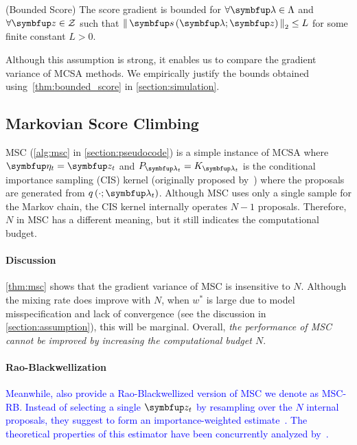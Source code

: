 \begin{assumption}{(Bounded Score)}\label{thm:bounded_score}
  The score gradient is bounded for \(\forall \vlambda \in \Lambda\) and \(\forall \vz \in \mathcal{Z}\) such that \(\norm{\vs\left(\vlambda; \vz\right)}_2 \leq L \) for some finite constant \(L > 0\).
\end{assumption}
%
Although this assumption is strong, it enables us to compare the gradient variance of MCSA methods.
We empirically justify the bounds obtained using~\cref{thm:bounded_score} in \cref{section:simulation}.

\vspace{-0.07in}
\subsection{Markovian Score Climbing}
\vspace{-0.07in}

MSC (\cref{alg:msc} in \cref{section:pseudocode}) is a simple instance of MCSA where \(\veta_t = \vz_t\) and \(P_{\vlambda_t} = K_{\vlambda_t}\) is the conditional importance sampling (CIS) kernel (originally proposed by~\citet{andrieu_uniform_2018}) where the proposals are generated from \(q\left(\cdot; \vlambda_t\right)\).
Although MSC uses only a single sample for the Markov chain, the CIS kernel internally operates \(N-1\) proposals.
Therefore, \(N\) in MSC has a different meaning, but it still indicates the computational budget.


\vspace{0.04in}


\vspace{-0.1in}
\paragraph{Discussion}
\cref{thm:msc} shows that the gradient variance of MSC is insensitive to \(N\).
Although the mixing rate does improve with \(N\), when \(w^*\) is large due to model misspecification and lack of convergence (see the discussion in \cref{section:assumption}), this will be marginal.
Overall, \textit{the performance of MSC cannot be improved by increasing the computational budget \(N\)}.

\vspace{-0.1in}
\paragraph{Rao-Blackwellization}
\textcolor{blue}{
Meanwhile, \citeauthor{NEURIPS2020_b2070693} also provide a Rao-Blackwellized version of MSC we denote as MSC-RB.
Instead of selecting a single \(\vz_t\) by resampling over the \(N\) internal proposals, they suggest to form an importance-weighted estimate~\citep{robert_monte_2004}.
The theoretical properties of this estimator have been concurrently analyzed by~\citet{cardoso_brsnis_2022}.
}

